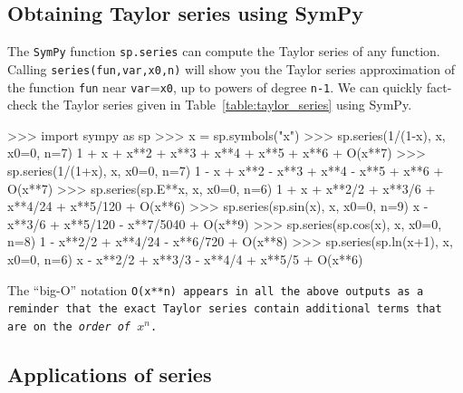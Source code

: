 	\subsection{Obtaining Taylor series using SymPy}
	\label{series:taylor_series_using_sympy}

		The \texttt{SymPy} function \texttt{sp.series}
		can compute the Taylor series of any function.
		Calling \texttt{series(fun,var,x0,n)} 
		will show you the Taylor series approximation of the function \texttt{fun}
		near \texttt{var}=\texttt{x0},
		up to powers of degree \texttt{n-1}.
		We can quickly fact-check the Taylor series given in Table~\ref{table:taylor_series} using SymPy.

		\begin{codeblock}[]
		>>> import sympy as sp
		>>> x = sp.symbols("x")
		>>> sp.series(1/(1-x), x, x0=0, n=7)
		1 + x + x**2 + x**3 + x**4 + x**5 + x**6 + O(x**7)
		>>> sp.series(1/(1+x), x, x0=0, n=7)
		1 - x + x**2 - x**3 + x**4 - x**5 + x**6 + O(x**7)
		>>> sp.series(sp.E**x, x, x0=0, n=6)
		1 + x + x**2/2 + x**3/6 + x**4/24 + x**5/120 + O(x**6)
		>>> sp.series(sp.sin(x), x, x0=0, n=9)
		x - x**3/6 + x**5/120 - x**7/5040 + O(x**9)
		>>> sp.series(sp.cos(x), x, x0=0, n=8)
		1 - x**2/2 + x**4/24 - x**6/720 + O(x**8)
		>>> sp.series(sp.ln(x+1), x, x0=0, n=6)
		x - x**2/2 + x**3/3 - x**4/4 + x**5/5 + O(x**6)
		\end{codeblock}

		\noindent
		The ``big-O'' notation \tt{O(x**n)} appears in all the above outputs
		as a reminder that the exact Taylor series
		contain additional terms that are on the \emph{order of} $x^n$.




	\subsection{Applications of series}
	\label{series:applications}

